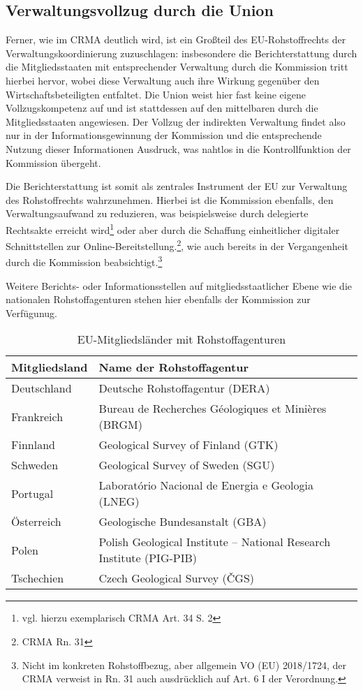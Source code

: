 \documentclass[12pt,a4paper,oneside]{book} %
\begin{document}
\subsection{Verwaltungsvollzug durch die Union}
Ferner, wie im CRMA deutlich wird, ist ein Großteil des EU-Rohstoffrechts der Verwaltungskoordinierung zuzuschlagen: insbesondere die Berichterstattung durch die Mitgliedsstaaten mit entsprechender Verwaltung durch die Kommission tritt hierbei hervor, wobei diese Verwaltung auch ihre Wirkung gegenüber den Wirtschaftsbeteiligten entfaltet. Die Union weist hier fast keine eigene Vollzugskompetenz auf und ist stattdessen auf den mittelbaren durch die Mitgliedsstaaten angewiesen. Der Vollzug der indirekten Verwaltung findet also nur in der Informationsgewinnung der Kommission und die entsprechende Nutzung dieser Informationen Ausdruck, was nahtlos in die Kontrollfunktion der Kommission übergeht.

Die Berichterstattung ist somit als zentrales Instrument der EU zur Verwaltung des Rohstoffrechts wahrzunehmen. Hierbei ist die Kommission ebenfalls, den Verwaltungsaufwand zu reduzieren, was beispielsweise durch delegierte Rechtsakte erreicht wird\footnote{vgl. hierzu exemplarisch CRMA Art. 34 S. 2} oder aber durch die Schaffung einheitlicher digitaler Schnittstellen zur Online-Bereitstellung.\footnote{CRMA Rn. 31}, wie auch bereits in der Vergangenheit durch die Kommission beabsichtigt.\footnote{Nicht im konkreten Rohstoffbezug, aber allgemein VO (EU) 2018/1724, der CRMA verweist in Rn. 31 auch ausdrücklich auf Art. 6 I der Verordnung.}

Weitere Berichts- oder Informationsstellen auf mitgliedsstaatlicher Ebene wie die nationalen Rohstoffagenturen stehen hier ebenfalls der Kommission zur Verfügunug.
\begin{table}[h!]
	\centering
	\begin{tabular}{|l|l|}
		\hline
		\textbf{Mitgliedsland} & \textbf{Name der Rohstoffagentur} \\ \hline
		Deutschland            & Deutsche Rohstoffagentur (DERA) \\ \hline
		Frankreich             & Bureau de Recherches Géologiques et Minières (BRGM) \\ \hline
		Finnland               & Geological Survey of Finland (GTK) \\ \hline
		Schweden               & Geological Survey of Sweden (SGU) \\ \hline
		Portugal               & Laboratório Nacional de Energia e Geologia (LNEG) \\ \hline
		Österreich             & Geologische Bundesanstalt (GBA) \\ \hline
		Polen                  & Polish Geological Institute – National Research Institute (PIG-PIB) \\ \hline
		Tschechien             & Czech Geological Survey (ČGS) \\ \hline
	\end{tabular}
	\caption{EU-Mitgliedsländer mit Rohstoffagenturen}
	\label{tab:rohstoffagenturen}
\end{table}
\end{document}
